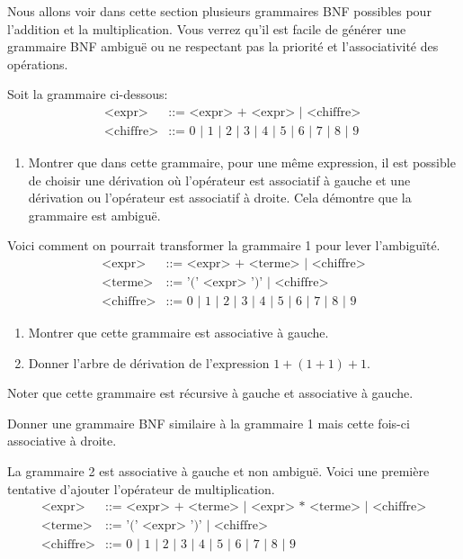 \begin{Exercise}[title={Grammaire pour l'addition et la multiplication}]
  \label{ex:grammaire-add-mult}
Nous allons voir dans cette section plusieurs grammaires BNF
possibles pour l'addition et la multiplication. Vous verrez qu'il est
facile de générer une grammaire BNF ambiguë ou ne respectant pas la
priorité et l'associativité des opérations.

\ExePart[title={Grammaire 1}]
\label{expart:grammaire1}
Soit la grammaire ci-dessous:
\begin{align*}
  \text{<expr>}  &\text{::=  <expr> + <expr> | <chiffre>} \\
  \text{<chiffre>}  &\text{::=  0 | 1 | 2 | 3 | 4 | 5 | 6 | 7 | 8 | 9 }
\end{align*}
\begin{enumerate}
\item Montrer que dans cette grammaire, pour une même expression, il
  est possible de choisir une dérivation où l'opérateur est
  associatif à gauche et une dérivation ou l'opérateur est
  associatif à droite. Cela démontre que la grammaire est ambiguë.
\end{enumerate}
\vspace{-\bigskipamount}

\ExePart[title={Grammaire 2}]
Voici comment on pourrait transformer la grammaire 1 pour lever
l'ambiguïté.
\begin{align*}
  \text{<expr>}  &\text{::=  <expr> + <terme> | <chiffre>} \\
  \text{<terme>} &\text{::= '(' <expr> ')' | <chiffre>} \\
  \text{<chiffre>}  &\text{::=  0 | 1 | 2 | 3 | 4 | 5 | 6 | 7 | 8 | 9 }
\end{align*}
\begin{enumerate}
\item Montrer que cette grammaire est associative à gauche.
\item Donner l'arbre de dérivation de l'expression $1 + (1 + 1) + 1$.
\end{enumerate}
Noter que cette grammaire est récursive à gauche et associative à
gauche.

\ExePart[title={Grammaire 3}]
Donner une grammaire BNF similaire à la grammaire 1 mais cette
fois-ci associative à droite.

\ExePart[title={Grammaire 4}]
La grammaire 2 est associative à gauche et non ambiguë. Voici une
première tentative d'ajouter l'opérateur de multiplication.
\begin{align*}
  \text{<expr>}  &\text{::=  <expr> + <terme> |  <expr> * <terme> | <chiffre>} \\
  \text{<terme>} &\text{::= '(' <expr> ')' | <chiffre>} \\
  \text{<chiffre>}  &\text{::=  0 | 1 | 2 | 3 | 4 | 5 | 6 | 7 | 8 | 9 }
\end{align*}


\end{Exercise}
